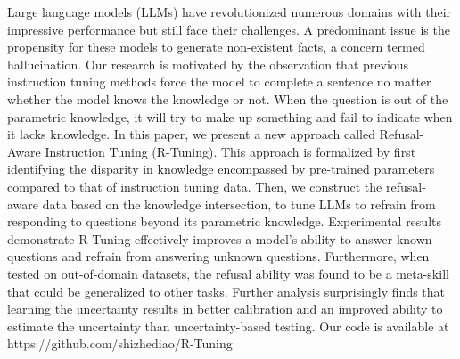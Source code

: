Large language models (LLMs) have revolutionized numerous domains with their impressive performance but still face their challenges.  A predominant issue is the propensity for these models to generate non-existent facts, a concern termed hallucination. Our research is motivated by the observation that previous instruction tuning methods force the model to complete a sentence no matter whether the model knows the knowledge or not. When the question is out of the parametric knowledge, it will try to make up something and fail to indicate when it lacks knowledge. In this paper, we present a new approach called Refusal-Aware Instruction Tuning (R-Tuning). This approach is formalized by first identifying the disparity in knowledge encompassed by pre-trained parameters compared to that of instruction tuning data. Then, we construct the refusal-aware data based on the knowledge intersection, to tune LLMs to refrain from responding to questions beyond its parametric knowledge. Experimental results demonstrate R-Tuning effectively improves a model's ability to answer known questions and refrain from answering unknown questions. Furthermore, when tested on out-of-domain datasets, the refusal ability was found to be a meta-skill that could be generalized to other tasks. Further analysis surprisingly finds that learning the uncertainty results in better calibration and an improved ability to estimate the uncertainty than uncertainty-based testing. Our code is available at https://github.com/shizhediao/R-Tuning